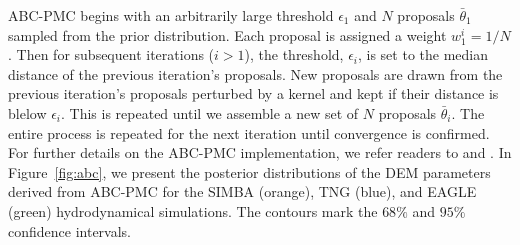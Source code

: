ABC-PMC begins with an arbitrarily large threshold $\epsilon_1$ and $N$ proposals 
$\bar{\theta}_1$ sampled from the prior distribution. Each proposal is
assigned a weight $w^i_1 = 1/N$. Then for subsequent iterations ($i > 1$), the 
threshold, $\epsilon_i$, is set to the median distance of the previous iteration's
proposals. New proposals are drawn from the previous iteration's proposals perturbed 
by a kernel and kept if their distance is blelow $\epsilon_i$. This is repeated
until we assemble a new set of $N$ proposals $\bar{\theta}_i$. The entire
process is repeated for the next iteration until convergence is confirmed. For 
further details on the ABC-PMC implementation, we refer readers to \cite{hahn2017b}
and \cite{hahn2019a}.
In Figure~\ref{fig:abc}, we present the posterior distributions of the DEM parameters
derived from ABC-PMC for the SIMBA (orange), TNG (blue), and EAGLE (green) hydrodynamical 
simulations. The contours mark the $68\%$ and $95\%$ confidence intervals. 

